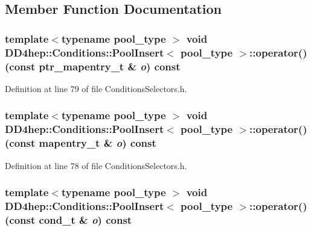 \subsection{Member Function Documentation}
\hypertarget{class_d_d4hep_1_1_conditions_1_1_pool_insert_a7d713a389670422fdb90fa3b8cc710b3}{
\subsubsection[{operator()}]{\setlength{\rightskip}{0pt plus 5cm}template$<$typename pool\_\-type $>$ void {\bf DD4hep::Conditions::PoolInsert}$<$ pool\_\-type $>$::operator() (const {\bf ptr\_\-mapentry\_\-t} \& {\em o}) const}}
\label{class_d_d4hep_1_1_conditions_1_1_pool_insert_a7d713a389670422fdb90fa3b8cc710b3}


Definition at line 79 of file ConditionsSelectors.h.\hypertarget{class_d_d4hep_1_1_conditions_1_1_pool_insert_a0812562134f2be54bce7d6f87d6e4425}{
\subsubsection[{operator()}]{\setlength{\rightskip}{0pt plus 5cm}template$<$typename pool\_\-type $>$ void {\bf DD4hep::Conditions::PoolInsert}$<$ pool\_\-type $>$::operator() (const {\bf mapentry\_\-t} \& {\em o}) const}}
\label{class_d_d4hep_1_1_conditions_1_1_pool_insert_a0812562134f2be54bce7d6f87d6e4425}


Definition at line 78 of file ConditionsSelectors.h.\hypertarget{class_d_d4hep_1_1_conditions_1_1_pool_insert_a414d9a2abc0fd973df8ba3153c67cfd1}{
\subsubsection[{operator()}]{\setlength{\rightskip}{0pt plus 5cm}template$<$typename pool\_\-type $>$ void {\bf DD4hep::Conditions::PoolInsert}$<$ pool\_\-type $>$::operator() (const {\bf cond\_\-t} \& {\em o}) const}}
\label{class_d_d4hep_1_1_conditions_1_1_pool_insert_a414d9a2abc0fd973df8ba3153c67cfd1}


